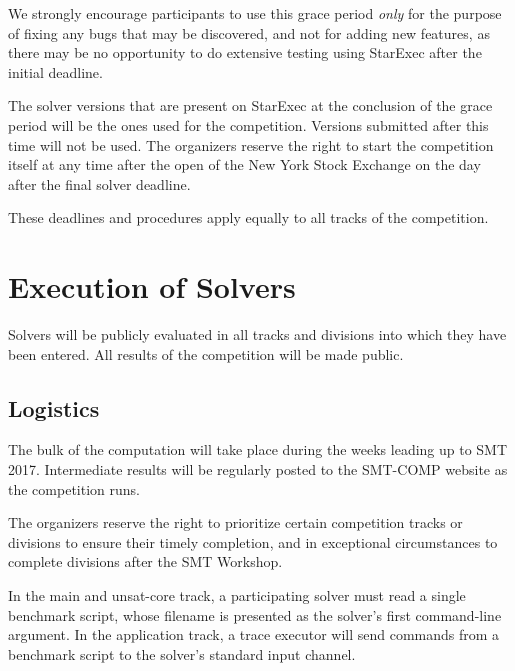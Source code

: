 \documentclass[12pt]{article}
\begin{document}
We strongly encourage participants to use this grace period
\emph{only} for the purpose of fixing any bugs that may be discovered,
and not for adding new features, as there may be no opportunity to do
extensive testing using StarExec after the initial deadline.

The solver versions that are present on StarExec at the conclusion of
the grace period will be the ones used for the competition.  Versions
submitted after this time will not be used.  The organizers reserve
the right to start the competition itself at any time after the open
of the New York Stock Exchange on the day after the final solver
deadline.

These deadlines and procedures apply equally to all tracks of the
competition.


\section{Execution of Solvers}

Solvers will be publicly evaluated in all tracks and divisions into
which they have been entered.  All results of the competition will be
made public.

\subsection{Logistics}
\label{sec:logistics}

%
The bulk of the computation will take place during the weeks leading
up to SMT 2017.  Intermediate results will be regularly posted to the
SMT-COMP website as the competition runs.

The organizers reserve the right to prioritize certain competition
tracks or divisions to ensure their timely completion, and in
exceptional circumstances to complete divisions after the SMT
Workshop.

%
In the main and unsat-core track, a participating solver must read a
single benchmark script, whose filename is presented as the solver's
first command-line argument.  In the application track, a trace
executor will send commands from a benchmark script to the solver's
standard input channel.
\end{document}
